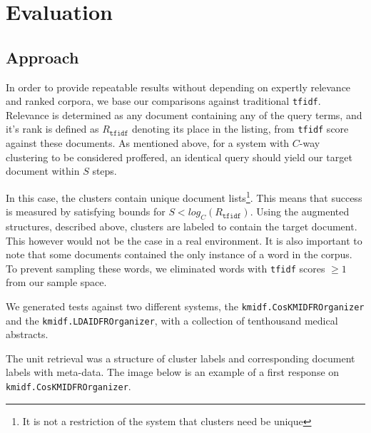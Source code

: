 \documentclass[11pt]{article}
\def\tfidf{\texttt{tfidf}\xspace}
\begin{document}
\section{Evaluation}
\subsection{Approach}
In order to provide repeatable results without depending on expertly relevance
and ranked corpora, we base our comparisons against traditional \tfidf. Relevance
is determined as any document containing any of the query terms, and it's rank is
defined as $R_\tfidf$ denoting its place in the listing, from \tfidf score
against these documents. As mentioned above, for a system with $C$-way clustering
to be considered proffered, an identical query should yield our target document
within $S$ steps.

In this case, the clusters contain unique document lists\footnote{It is not a
  restriction of the system that clusters need be unique}. This means that success
is measured by satisfying bounds for \(S < log_C\left(R_\tfidf\right)\).
Using the augmented structures, described above, clusters are labeled to contain
the target document. This however would not be the case in a real environment.
It is also important to note that some documents contained the only instance of
a word in the corpus. To prevent sampling these words, we eliminated words with
\tfidf scores $\geq 1$ from our sample space.

We generated tests against two different systems, the \texttt{kmidf.CosKMIDFROrganizer}
and the \texttt{kmidf.LDAIDFROrganizer}, with a collection of tenthousand medical
abstracts.

The unit retrieval was a structure of cluster labels and corresponding document labels with
meta-data. The image below is an example of a first response on \texttt{kmidf.CosKMIDFROrganizer}.
\end{document}
